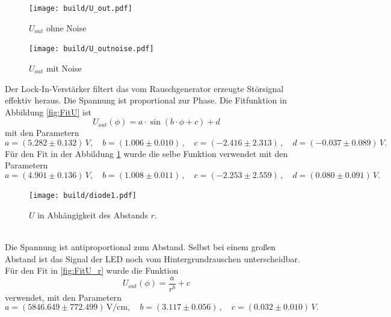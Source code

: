 \begin{figure}[H]
    \begin{minipage}[b]{.49\linewidth} %
       \texttt{[image: build/U\_out.pdf]}
       \caption{$U_{out}$ ohne Noise}
       \label{fig:FitU}
    \end{minipage}
    \hspace{0.02\linewidth}%
    \begin{minipage}[b]{.49\linewidth} %
       \texttt{[image: build/U\_outnoise.pdf]}
       \caption{$U_{out}$ mit Noise}
       \label{fig:FitU_noise}
    \end{minipage}
\end{figure}
Der Lock-In-Verstärker filtert das vom Rauschgenerator erzeugte Störsignal effektiv heraus. Die Spannung ist proportional zur Phase.
Die Fitfunktion in Abbildung \ref{fig:FitU} ist
\begin{equation*}
   U_{out}(\phi) = a \cdot \sin(b\cdot\phi + c) + d
\end{equation*}
mit den Parametern
\begin{equation*}
   a = (5.282 \pm 0.132) \,\unit{V}, \quad b = (1.006 \pm 0.010) \,, \quad c = (-2.416 \pm 2.313) \,, \quad d = (-0.037 \pm 0.089) \,\unit{V}.
\end{equation*}
Für den Fit in der Abbildung \ref{fig:FitU_noise} wurde die selbe Funktion verwendet mit den Parametern
\begin{equation*}
   a = (4.901 \pm 0.136) \,\unit{V}, \quad b = (1.008 \pm 0.011) \,, \quad c = (-2.253 \pm 2.559) \,, \quad d = (0.080 \pm 0.091) \,\unit{V}.
\end{equation*}
\begin{figure}
    \centering
    \texttt{[image: build/diode1.pdf]}
    \caption{$U$ in Abhängigkeit des Abstands $r.$}
    \label{fig:FitU_r}
\end{figure}
\\
Die Spannung ist antiproportional zum Abstand. Selbst bei einem großen Abstand ist das Signal der LED noch vom Hintergrundrauschen unterscheidbar.
Für den Fit in \autoref{fig:FitU_r} wurde die Funktion 
\begin{equation*}
   U_{out}(\phi) = \frac{a}{r^b} + c
\end{equation*}
verwendet, mit den Parametern
\begin{equation*}
   a = (5846.649 \pm 772.499) \,\unit{\V\per\centi\m} , \quad b = (3.117 \pm 0.056) \, , \quad c = (0.032 \pm 0.010) \,\unit{V}.
\end{equation*}

\newpage